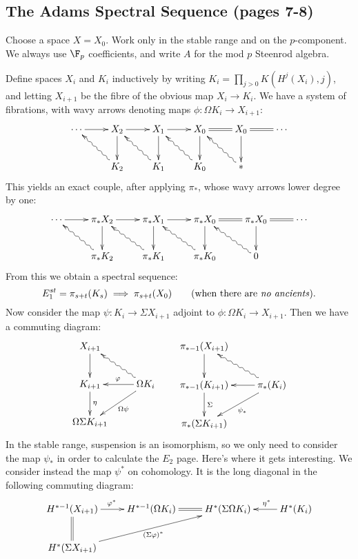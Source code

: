 \documentclass[11pt]{article}
\begin{document}
\begin{ASSp7-8}

\section*{The Adams Spectral Sequence (pages 7-8)}
Choose a space $X=X_0$. Work only in the stable range  and on the $p$-component. We always use $\F_p$ coefficients, and write $A$ for the mod $p$ Steenrod algebra.

Define spaces $X_i$ and $K_i$ inductively by writing $K_i=\prod_{j>0}K(H^j(X_i),j)$, and letting $X_{i+1}$ be the fibre of the obvious map $X_i\to K_i$. We have a system of fibrations, with wavy arrows denoting maps $\phi:\Omega K_i\to X_{i+1}$:
\[\xymatrix{
\cdots\ar[r]&
X_2\ar[r]\ar[d]&
X_1\ar[r]\ar[d]&
X_0\ar@{=}[r]\ar[d]&
X_0\ar@{=}[r]\ar[d]&
\cdots\\
&
K_2\ar@{~>}[ul]&
K_1\ar@{~>}[ul]&
K_0\ar@{~>}[ul]&
\ast\ar@{~>}[ul]&
}\]
This yields an exact couple, after applying $\pi_*$, whose wavy arrows lower degree by one:
\[\xymatrix{
\cdots\ar[r]&
\pi_*X_2\ar[r]\ar[d]&
\pi_*X_1\ar[r]\ar[d]&
\pi_*X_0\ar@{=}[r]\ar[d]&
\pi_*X_0\ar@{=}[r]\ar[d]&
\cdots\\
&
\pi_*K_2\ar@{~>}[ul]&
\pi_*K_1\ar@{~>}[ul]&
\pi_*K_0\ar@{~>}[ul]&
0\ar@{~>}[ul]&
}
\]
From this we obtain a spectral sequence:
\[E_1^{st}=\pi_{s+t}(K_s)\implies \pi_{s+t}(X_0)\textup{\qquad (when there are \textit{no ancients}).}\]
Now consider the map $\psi:K_i\to\Sigma X_{i+1}$ adjoint to $\phi:\Omega K_i\to X_{i+1}$. Then we have a commuting diagram:
\[\xymatrix{
X_{i+1}\ar[d]\\
K_{i+1}\ar[d]^\eta&\Omega K_i\ar[l]_\phi\ar[ld]^{\Omega\psi}\ar@{~>}[lu]\\
\Omega\Sigma K_{i+1}
}
\qquad 
\xymatrix{
\pi_{*-1}(X_{i+1})\ar[d]\\
\pi_{*-1}(K_{i+1})\ar[d]^\Sigma&\pi_{*} (K_i)\ar[l]\ar[ld]^{\psi_*}\ar@{~>}[lu]\\
\pi_{*}(\Sigma K_{i+1})
}
\]
In the stable range, suspension is an isomorphism, so we only need to consider the map $\psi_*$ in order to calculate the $E_2$ page. Here's where it gets interesting. We consider instead the map $\psi^*$ on cohomology. It is the long diagonal in the following commuting diagram:
\[\xymatrix{
H^{*-1}(X_{i+1})\ar@{=}[d]\ar[r]^{\phi^*}&H^{*-1}(\Omega K_i)\ar@{=}[r]&H^*(\Sigma\Omega K_i)& H^*(K_i)\ar[l]_{\quad  \eta^*}\\
H^{*}(\Sigma X_{i+1})\ar[rru]_{(\Sigma\phi)^*}&\\
}\]
\end{ASSp7-8}
\end{document}
